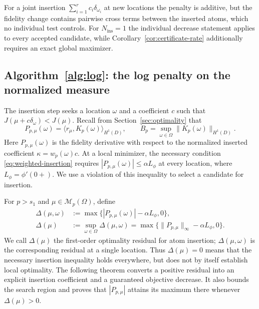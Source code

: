 \documentclass[11pt]{amsart}
\theoremstyle{definition}
\theoremstyle{remark}
\begin{document}
For a joint insertion
$\sum_{i=1}^rc_i\delta_{\omega_i}$ at new locations the penalty is
additive, but the fidelity change contains pairwise cross terms between the
inserted atoms, which no individual test controls. For
$N_{\mathrm{ins}}=1$ the individual
decrease statement applies to every accepted candidate, while
Corollary~\ref{cor:certificate-rate} additionally requires an exact global
maximizer.

\subsection{Algorithm~\ref{alg:log}: the log penalty on the normalized measure}

The insertion step seeks a location $\omega$ and a coefficient $c$ such that
$J(\mu+c\delta_\omega)<J(\mu)$. Recall from
Section~\ref{sec:optimality} that
\begin{equation*}
	P_{p,\mu}(\omega)=\langle r_\mu,K_p(\omega)\rangle_{H^1(D)},
	\qquad
	B_p=\sup_{\omega\in\Omega}\|K_p(\omega)\|_{H^1(D)}.
\end{equation*}
Here $P_{p,\mu}(\omega)$ is the fidelity derivative with respect to the
normalized inserted coefficient $\kappa=w_p(\omega)c$.
At a local minimizer, the necessary condition \eqref{eq:weighted-insertion}
requires $|P_{p,\mu}(\omega)|\le\alpha L_\phi$ at every location, where
$L_\phi=\phi'(0+)$. We use a violation of this inequality to select a
candidate for insertion.

For $p>s_1$ and $\mu\in\mathcal M_p(\Omega)$, define
\begin{align*}
	\Delta(\mu,\omega)
	&:=\max\bigl\{|P_{p,\mu}(\omega)|-\alpha L_\phi,0\bigr\},\\
	\Delta(\mu)
	&:=\sup_{\omega\in\Omega}\Delta(\mu,\omega)
	=\max\bigl\{\|P_{p,\mu}\|_\infty-\alpha L_\phi,0\bigr\}.
\end{align*}
We call $\Delta(\mu)$ the first-order optimality residual for atom insertion;
$\Delta(\mu,\omega)$ is the corresponding residual at a single location.
Thus $\Delta(\mu)=0$ means that the necessary insertion inequality holds
everywhere, but does not by itself establish local optimality.
The following theorem converts a positive residual into an explicit
insertion coefficient and a guaranteed objective decrease. It also bounds
the search region and proves that $|P_{p,\mu}|$ attains its maximum there
whenever $\Delta(\mu)>0$.
\end{document}
